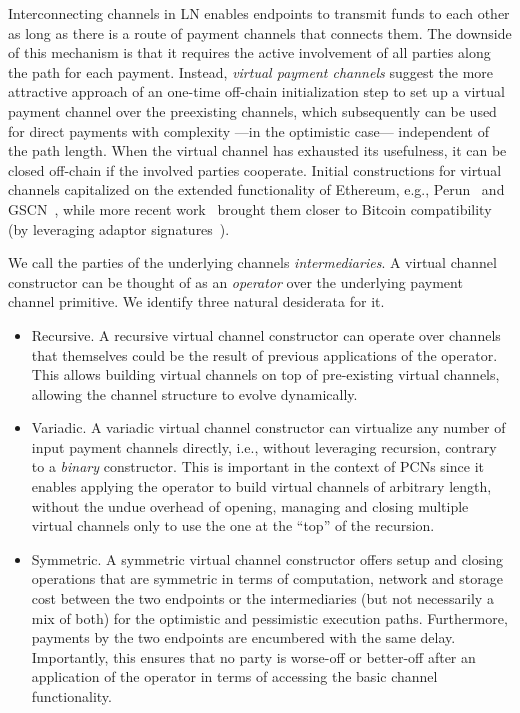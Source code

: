 Interconnecting channels in LN enables endpoints to transmit funds
to each other as long as there is a route of payment channels that connects
them. The downside of this mechanism is that it requires the active involvement
of all parties along the path for each payment. Instead, \emph{virtual payment
channels} suggest the more attractive approach of an one-time off-chain
initialization step to set up a virtual payment channel over the preexisting
channels, which subsequently can
be used for direct payments with complexity ---in the optimistic case---
independent of the path length. When the virtual channel has exhausted
its usefulness, it can be closed off-chain if the involved parties cooperate.
Initial constructions for virtual channels capitalized on the extended functionality of Ethereum, e.g.,
Perun~\cite{perun} and GSCN~\cite{DBLP:conf/ccs/DziembowskiFH18}, while more
recent work~\cite{9519487} brought them closer to
Bitcoin compatibility (by leveraging adaptor
signatures~\cite{DBLP:journals/iacr/AumayrEEFHMMR20}).

We call the parties of the underlying channels \emph{intermediaries}.
A virtual channel constructor can be thought of as an \emph{operator} over the
underlying payment channel primitive. We identify three natural
desiderata for it.

\begin{itemize}
\item Recursive. A recursive virtual channel constructor can operate over
channels that themselves could be the result of previous applications of the
operator. This allows building
virtual channels on top of pre-existing virtual channels, allowing the channel
structure to evolve dynamically.
\item Variadic. A variadic virtual channel constructor can virtualize any number
of input payment channels directly, i.e., without leveraging recursion, contrary to a \emph{binary} constructor. This is
important in the context of PCNs since it enables applying the operator to build
virtual channels of arbitrary length, without the undue overhead of opening,
managing and closing multiple virtual channels only to use the one at the
``top'' of the recursion.
\item Symmetric. A symmetric virtual channel constructor offers setup and
closing operations that are symmetric in terms of computation, network and storage cost between the two
endpoints or the intermediaries (but not necessarily a mix of both) for the
optimistic and pessimistic execution paths. Furthermore, payments by the two
endpoints are encumbered with the same delay. Importantly, this ensures that no
party is worse-off or better-off after an application of the operator in terms
of accessing the basic channel functionality.
\end{itemize}

